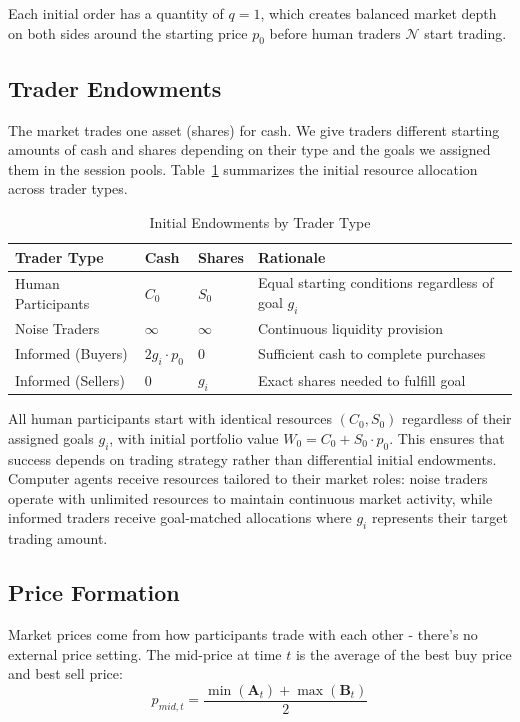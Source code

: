 Each initial order has a quantity of $q = 1$, which creates balanced market depth on both sides around the starting price $p_0$ before human traders $\mathcal{N}$ start trading.

\subsection{Trader Endowments}

The market trades one asset (shares) for cash. We give traders different starting amounts of cash and shares depending on their type and the goals we assigned them in the session pools. Table~\ref{tab:endowments} summarizes the initial resource allocation across trader types.

\begin{table}[ht]
\centering
\caption{Initial Endowments by Trader Type}
\label{tab:endowments}
\begin{tabular}{llll}
\toprule
Trader Type & Cash & Shares & Rationale \\
\midrule
Human Participants & $C_0$ & $S_0$ & Equal starting conditions regardless of goal $g_i$ \\
Noise Traders & $\infty$ & $\infty$ & Continuous liquidity provision \\
Informed (Buyers) & $2g_i \cdot p_0$ & $0$ & Sufficient cash to complete purchases \\
Informed (Sellers) & $0$ & $g_i$ & Exact shares needed to fulfill goal \\
\bottomrule
\end{tabular}
\end{table}

All human participants start with identical resources $(C_0, S_0)$ regardless of their assigned goals $g_i$, with initial portfolio value $W_0 = C_0 + S_0 \cdot p_0$. This ensures that success depends on trading strategy rather than differential initial endowments. Computer agents receive resources tailored to their market roles: noise traders operate with unlimited resources to maintain continuous market activity, while informed traders receive goal-matched allocations where $g_i$ represents their target trading amount.

\subsection{Price Formation}

Market prices come from how participants trade with each other - there's no external price setting. The mid-price at time $t$ is the average of the best buy price and best sell price:
\begin{equation}
p_{mid,t} = \frac{\min(\mathbf{A}_t) + \max(\mathbf{B}_t)}{2}
\end{equation}

